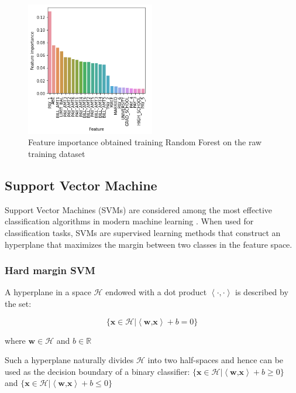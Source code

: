 \documentclass{article}
\begin{document}
\begin{figure}[h]
\centering
\includegraphics[width=0.5\textwidth]{featureRF.png}
\caption{Feature importance obtained training Random Forest on the raw training dataset}
\end{figure}


\newpage
\subsection{Support Vector Machine}
Support Vector Machines (SVMs) are considered among the most effective classification algorithms in modern machine learning \cite{tredici}. When used for classification tasks, SVMs are supervised learning methods that construct an hyperplane that maximizes the margin between two classes in the feature space.
\subsubsection{Hard margin SVM}
A hyperplane in a space $\mathcal{H}$ endowed with a dot product $\left \langle \cdot,\cdot \right \rangle$ is described by the set:

\begin{equation}
\{\textbf{x} \in \mathcal{H}|\left \langle \textbf{w,x} \right \rangle + b = 0\}
\end{equation}

where $\textbf{w} \in \mathcal{H}$ and $b \in \mathbb{R}$

Such a hyperplane naturally divides  $\mathcal{H}$ into two half-spaces and hence can be used as the decision boundary of a binary classifier: $\{\textbf{x} \in \mathcal{H}|\left \langle \textbf{w,x} \right \rangle + b \geq 0\}$ and $\{\textbf{x} \in \mathcal{H}|\left \langle \textbf{w,x} \right \rangle + b \leq 0\}$
\end{document}
